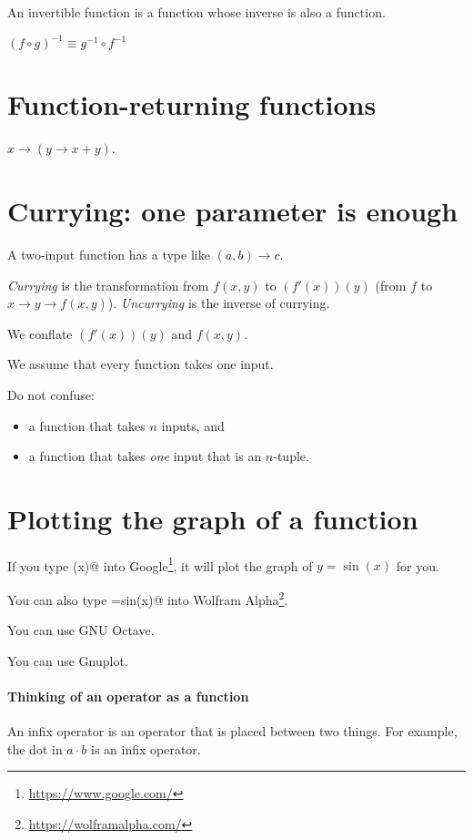 An invertible function is a function whose inverse is also a function.

\((f \circ g)^{-1} \equiv g^{-1} \circ f^{-1}\)

\section{Function-returning functions}

\(x \to (y \to x+y)\).

\section{Currying: one parameter is enough}

A two-input function has a type like \( (a,b) \to c \).

%
\emph{Currying} is the transformation from \( f(x,y) \) to \( (f'(x))(y) \) (from \(f\) to \(x \to y \to f(x,y)\)).
\emph{Uncurrying} is the inverse of currying.

We conflate \( (f'(x))(y) \) and \( f(x,y) \).

We assume that every function takes one input.

Do not confuse:
\begin{itemize}
    \item a function that takes \(n\) inputs, and
    \item a function that takes \emph{one} input that is an \(n\)-tuple.
\end{itemize}

\section{Plotting the graph of a function}

If you type \verb@sin(x)@ into Google\footnote{\url{https://www.google.com/}},
it will plot the graph of \(y = \sin(x)\) for you.

You can also type \verb@y=sin(x)@ into Wolfram Alpha\footnote{\url{https://wolframalpha.com/}}.

You can use GNU Octave.

You can use Gnuplot.

\paragraph{Thinking of an operator as a function}

An infix operator is an operator that is placed between two things.
For example, the dot in \(a \cdot b\) is an infix operator.

